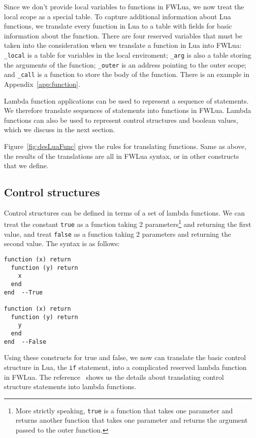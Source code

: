 Since we don't provide local variables to functions in FWLua, we now treat the local scope as a special table.
To capture additional information about Lua functions,
we translate every function in Lua to a table with fields for basic information about the function. There are four reserved variables that must be taken into the consideration when we translate a function in Lua into FWLua: {\tt \_local} is a table for variables in the local enviroment; {\tt \_arg} is also a table storing the arguments of the function; {\tt \_outer} is an address pointing to the outer scope; and {\tt \_call} is a function to store the body of the function. There is an example in Appendix~\ref{app:function}.

Lambda function applications can be used to represent a sequence of  statements. We therefore translate sequences of statements into functions in FWLua. Lambda functions can also be used to represent control structures and boolean values, which we discuss in the next section.

Figure~\ref{fig:desLuaFunc} gives the rules for translating functions. Same as above, the results of the translations are all in FWLua syntax, or in other constructs that we define.

\subsection{Control structures}
Control structures can be defined in terms of a set of lambda functions. 
We can treat the constant {\tt true} as a function taking 2 parameters\footnote{
  More strictly speaking, {\tt true} is a function that takes one parameter
  and returns another function that takes one parameter and returns
  the argument passed to the outer function.
}
and returning the first value, and treat {\tt false} as a function taking 2 parameters and returning the second value. The syntax is as follows:

\begin{verbatim}
function (x) return 
  function (y) return 
    x
  end
end  --True

function (x) return 
  function (y) return 
    y
  end
end  --False
\end{verbatim}

Using these constructs for true and false, we now can translate the basic control structure in Lua, the {\tt if} statement, into a complicated reserved lambda function in FWLua. The reference~\cite{TAPL} shows us the details about translating control structure statements into lambda functions.

